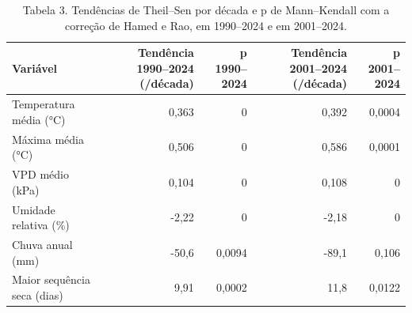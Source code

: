 \begin{table}
\caption{Tabela 3. Tendências de Theil–Sen por década e p de Mann–Kendall com a correção de Hamed e Rao, em 1990–2024 e em 2001–2024.}
\label{tab:03_clima:tapajos:tendencias}
\begin{tabular}{lrrrr}
\toprule
Variável & Tendência 1990–2024 (/década) & p 1990–2024 & Tendência 2001–2024 (/década) & p 2001–2024 \\
\midrule
Temperatura média (°C) & 0,363 & 0 & 0,392 & 0,0004 \\
Máxima média (°C) & 0,506 & 0 & 0,586 & 0,0001 \\
VPD médio (kPa) & 0,104 & 0 & 0,108 & 0 \\
Umidade relativa (\%) & -2,22 & 0 & -2,18 & 0 \\
Chuva anual (mm) & -50,6 & 0,0094 & -89,1 & 0,106 \\
Maior sequência seca (dias) & 9,91 & 0,0002 & 11,8 & 0,0122 \\
\bottomrule
\end{tabular}
\end{table}
